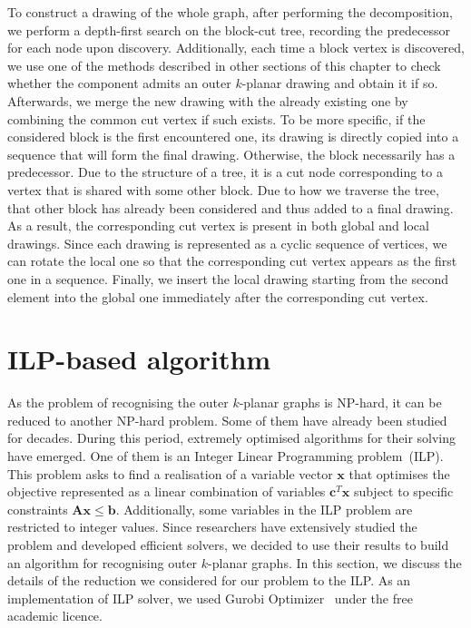 To construct a drawing of the whole graph, after performing the decomposition, we perform a depth-first search on the block-cut tree, recording the predecessor for each node upon discovery. Additionally, each time a block vertex is discovered, we use one of the methods described in other sections of this chapter to check whether the component admits an outer \(k\)-planar drawing and obtain it if so. Afterwards, we merge the new drawing with the already existing one by combining the common cut vertex if such exists. To be more specific, if the considered block is the first encountered one, its drawing is directly copied into a sequence that will form the final drawing. Otherwise, the block necessarily has a predecessor. Due to the structure of a tree, it is a cut node corresponding to a vertex that is shared with some other block. Due to how we traverse the tree, that other block has already been considered and thus added to a final drawing. As a result, the corresponding cut vertex is present in both global and local drawings. Since each drawing is represented as a cyclic sequence of vertices, we can rotate the local one so that the corresponding cut vertex appears as the first one in a sequence. Finally, we insert the local drawing starting from the second element into the global one immediately after the corresponding cut vertex.


\section{ILP-based algorithm}\label{sec:ILP-def}

As the problem of recognising the outer \(k\)-planar graphs is NP-hard, it can be reduced to another NP-hard problem. Some of them have already been studied for decades. During this period, extremely optimised algorithms for their solving have emerged. One of them is an Integer Linear Programming problem~(ILP). This problem asks to find a realisation of a variable vector \(\mathbf{x}\) that optimises the objective represented as a linear combination of variables \(\mathbf{c}^T\mathbf{x}\) subject to specific constraints \(\mathbf{Ax}\leqslant\mathbf{b}\). Additionally, some variables in the ILP problem are restricted to integer values. Since researchers have extensively studied the problem and developed efficient solvers, we decided to use their results to build an algorithm for recognising outer \(k\)-planar graphs. In this section, we discuss the details of the reduction we considered for our problem to the ILP\@. As an implementation of ILP solver, we used Gurobi Optimizer~\cite{gurobi} under the free academic licence.

